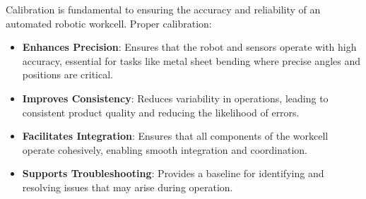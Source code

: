 Calibration is fundamental to ensuring the accuracy and reliability of an automated robotic workcell. Proper calibration:

\begin{itemize}
    \item \textbf{Enhances Precision}: Ensures that the robot and sensors operate with high accuracy, essential for tasks like metal sheet bending where precise angles and positions are critical.
    \item \textbf{Improves Consistency}: Reduces variability in operations, leading to consistent product quality and reducing the likelihood of errors.
    \item \textbf{Facilitates Integration}: Ensures that all components of the workcell operate cohesively, enabling smooth integration and coordination.
    \item \textbf{Supports Troubleshooting}: Provides a baseline for identifying and resolving issues that may arise during operation.
\end{itemize}

